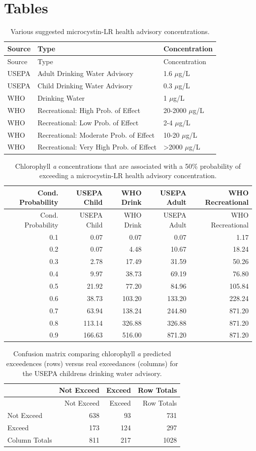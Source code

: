 \documentclass[11pt,]{article}
\begin{document}
\newpage

\section{Tables}\label{tables}

\begin{longtable}[c]{@{}lll@{}}
\caption{Various suggested microcystin-LR health advisory
concentrations. \label{tab:microcystin_levels}}\tabularnewline
\toprule
Source & Type & Concentration\tabularnewline
\midrule
\endfirsthead
\toprule
Source & Type & Concentration\tabularnewline
\midrule
\endhead
USEPA & Adult Drinking Water Advisory & 1.6 \(\mu\)g/L\tabularnewline
USEPA & Child Drinking Water Advisory & 0.3 \(\mu\)g/L\tabularnewline
WHO & Drinking Water & 1 \(\mu\)g/L\tabularnewline
WHO & Recreational: High Prob. of Effect & 20-2000
\(\mu\)g/L\tabularnewline
WHO & Recreational: Low Prob. of Effect & 2-4 \(\mu\)g/L\tabularnewline
WHO & Recreational: Moderate Prob. of Effect & 10-20
\(\mu\)g/L\tabularnewline
WHO & Recreational: Very High Prob. of Effect & \textgreater{}2000
\(\mu\)g/L\tabularnewline
\bottomrule
\end{longtable}

\newpage

\begin{longtable}[c]{@{}rrrrr@{}}
\caption{Chlorophyll \textit{a} concentrations that are associated with
a 50\% probability of exceeding a microcystin-LR health advisory
concentration. \label{tab:mc_chla_table}}\tabularnewline
\toprule
Cond. Probability & USEPA Child & WHO Drink & USEPA Adult & WHO
Recreational\tabularnewline
\midrule
\endfirsthead
\toprule
Cond. Probability & USEPA Child & WHO Drink & USEPA Adult & WHO
Recreational\tabularnewline
\midrule
\endhead
0.1 & 0.07 & 0.07 & 0.07 & 1.17\tabularnewline
0.2 & 0.07 & 4.48 & 10.67 & 18.24\tabularnewline
0.3 & 2.78 & 17.49 & 31.59 & 50.26\tabularnewline
0.4 & 9.97 & 38.73 & 69.19 & 76.80\tabularnewline
0.5 & 21.92 & 77.20 & 84.96 & 105.84\tabularnewline
0.6 & 38.73 & 103.20 & 133.20 & 228.24\tabularnewline
0.7 & 63.94 & 138.24 & 244.80 & 871.20\tabularnewline
0.8 & 113.14 & 326.88 & 326.88 & 871.20\tabularnewline
0.9 & 166.63 & 516.00 & 871.20 & 871.20\tabularnewline
\bottomrule
\end{longtable}

\newpage

\begin{longtable}[c]{@{}lrrr@{}}
\caption{Confusion matrix comparing chlorophyll \textit{a} predicted
exceedences (rows) versus real exceedances (columns) for the USEPA
childrens drinking water advisory.
\label{tab:child_conmat_table}}\tabularnewline
\toprule
& Not Exceed & Exceed & Row Totals\tabularnewline
\midrule
\endfirsthead
\toprule
& Not Exceed & Exceed & Row Totals\tabularnewline
\midrule
\endhead
Not Exceed & 638 & 93 & 731\tabularnewline
Exceed & 173 & 124 & 297\tabularnewline
Column Totals & 811 & 217 & 1028\tabularnewline
\bottomrule
\end{longtable}
\end{document}
